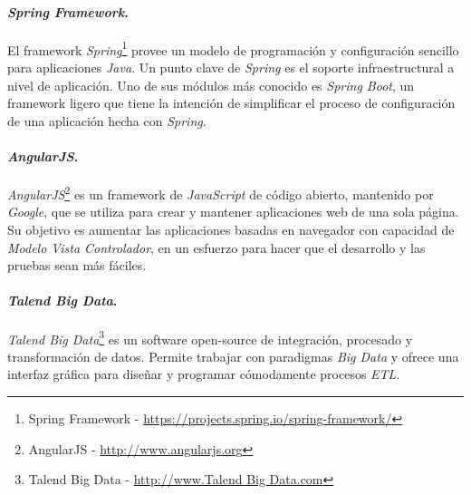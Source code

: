 \paragraph*{\textit{Spring Framework}.} El framework \textit{Spring}\footnote{Spring Framework - \url{https://projects.spring.io/spring-framework/}} provee un modelo de programación y configuración sencillo para aplicaciones \textit{Java}. Un punto clave de \textit{Spring} es el soporte infraestructural a nivel de aplicación. Uno de sus módulos más conocido es \textit{Spring Boot}, un framework ligero que tiene la intención de simplificar el proceso de configuración de una aplicación hecha con \textit{Spring}. 
\paragraph*{\textit{AngularJS}.} \textit{AngularJS}\footnote{AngularJS - \url{http://www.angularjs.org}} es un framework de \textit{JavaScript} de código abierto, mantenido por \textit{Google}, que se utiliza para crear y mantener aplicaciones web de una sola página. Su objetivo es aumentar las aplicaciones basadas en navegador con capacidad de \textit{Modelo Vista Controlador}, en un esfuerzo para hacer que el desarrollo y las pruebas sean más fáciles.
\paragraph*{\textit{Talend Big Data}.} \textit{Talend Big Data}\footnote{Talend Big Data - \url{http://www.Talend Big Data.com}} es un software open-source de integración, procesado y transformación de datos. Permite trabajar con paradigmas \textit{Big Data} y ofrece una interfaz gráfica para diseñar y programar cómodamente procesos \textit{ETL}. 

